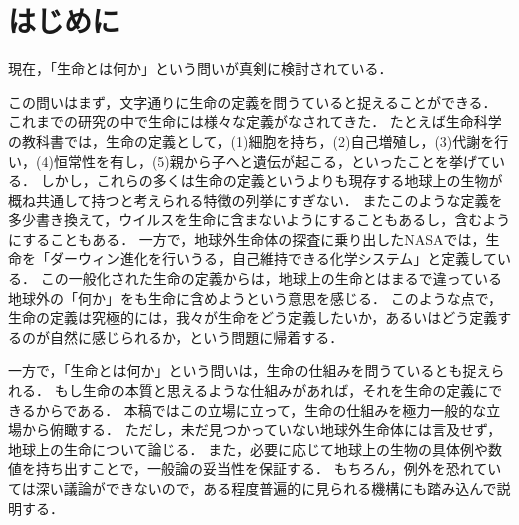 \section{はじめに}
現在，「生命とは何か」という問いが真剣に検討されている．

この問いはまず，文字通りに生命の定義を問うていると捉えることができる．
これまでの研究の中で生命には様々な定義がなされてきた．
たとえば生命科学の教科書では，生命の定義として，(1)細胞を持ち，(2)自己増殖し，(3)代謝を行い，(4)恒常性を有し，(5)親から子へと遺伝が起こる，といったことを挙げている．
しかし，これらの多くは生命の定義というよりも現存する地球上の生物が概ね共通して持つと考えられる特徴の列挙にすぎない．
またこのような定義を多少書き換えて，ウイルスを生命に含まないようにすることもあるし，含むようにすることもある．
一方で，地球外生命体の探査に乗り出したNASAでは，生命を「ダーウィン進化を行いうる，自己維持できる化学システム」と定義している．
この一般化された生命の定義からは，地球上の生命とはまるで違っている地球外の「何か」をも生命に含めようという意思を感じる．
このような点で，生命の定義は究極的には，我々が生命をどう定義したいか，あるいはどう定義するのが自然に感じられるか，という問題に帰着する．

一方で，「生命とは何か」という問いは，生命の仕組みを問うているとも捉えられる．
もし生命の本質と思えるような仕組みがあれば，それを生命の定義にできるからである．
本稿ではこの立場に立って，生命の仕組みを極力一般的な立場から俯瞰する．
ただし，未だ見つかっていない地球外生命体には言及せず，地球上の生命について論じる．
また，必要に応じて地球上の生物の具体例や数値を持ち出すことで，一般論の妥当性を保証する．
もちろん，例外を恐れていては深い議論ができないので，ある程度普遍的に見られる機構にも踏み込んで説明する．
